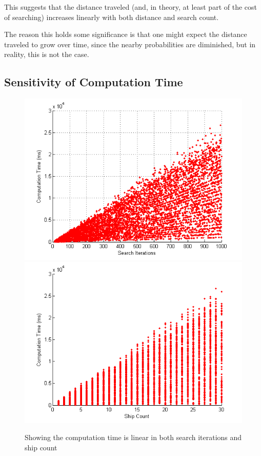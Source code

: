 \documentclass[a4paper]{article}
\begin{document}
This suggests that the distance traveled (and, in theory, at least part of the cost of searching) increases linearly with both distance and search count. 

The reason this holds some significance is that one might expect the distance traveled to grow over time, since the nearby probabilities are diminished, but in reality, this is not the case.

\subsection{Sensitivity of Computation Time}

\begin{figure}[H]\begin{center}
\includegraphics[scale=0.48]{../Matlab/Images/CompTimevsSearchIterations.png}
\includegraphics[scale=0.48]{../Matlab/Images/CompTimevsShipCount.png}
\caption{Showing the computation time is linear in both search iterations and ship count}
\end{center}\end{figure}
\end{document}

